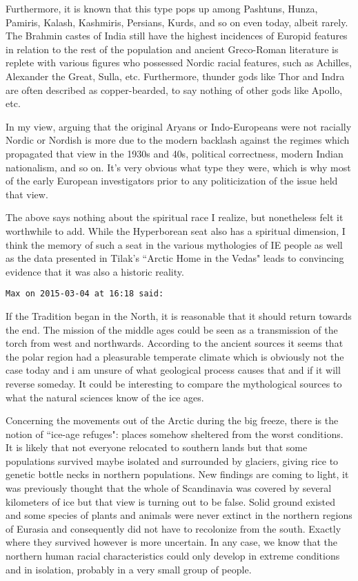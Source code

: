 \begin{footnotesize}
\begin{sffamily}
Furthermore, it is known that this type pops up among Pashtuns, Hunza, Pamiris, Kalash, Kashmiris, Persians, Kurds, and so on even today, albeit rarely. The Brahmin castes of India still have the highest incidences of Europid features in relation to the rest of the population and ancient Greco-Roman literature is replete with various figures who possessed Nordic racial features, such as Achilles, Alexander the Great, Sulla, etc. Furthermore, thunder gods like Thor and Indra are often described as copper-bearded, to say nothing of other gods like Apollo, etc.

In my view, arguing that the original Aryans or Indo-Europeans were not racially Nordic or Nordish is more due to the modern backlash against the regimes which propagated that view in the 1930s and 40s, political correctness, modern Indian nationalism, and so on. It's very obvious what type they were, which is why most of the early European investigators prior to any politicization of the issue held that view.

The above says nothing about the spiritual race I realize, but nonetheless felt it worthwhile to add. While the Hyperborean seat also has a spiritual dimension, I think the memory of such a seat in the various mythologies of IE people as well as the data presented in Tilak's ``Arctic Home in the Vedas" leads to convincing evidence that it was also a historic reality.


\hfill

\texttt{Max on 2015-03-04 at 16:18 said: }

If the Tradition began in the North, it is reasonable that it should return towards the end. The mission of the middle ages could be seen as a transmission of the torch from west and northwards. According to the ancient sources it seems that the polar region had a pleasurable temperate climate which is obviously not the case today and i am unsure of what geological process causes that and if it will reverse someday. It could be interesting to compare the mythological sources to what the natural sciences know of the ice ages.

Concerning the movements out of the Arctic during the big freeze, there is the notion of ``ice-age refuges": places somehow sheltered from the worst conditions. It is likely that not everyone relocated to southern lands but that some populations survived maybe isolated and surrounded by glaciers, giving rice to genetic bottle necks in northern populations. New findings are coming to light, it was previously thought that the whole of Scandinavia was covered by several kilometers of ice but that view is turning out to be false. Solid ground existed and some species of plants and animals were never extinct in the northern regions of Eurasia and consequently did not have to recolonize from the south. Exactly where they survived however is more uncertain. In any case, we know that the northern human racial characteristics could only develop in extreme conditions and in isolation, probably in a very small group of people.


\end{sffamily}
\end{footnotesize}
